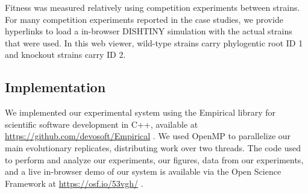 Fitness was measured relatively using competition experiments between strains.
For many competition experiments reported in the case studies, we provide hyperlinks to load a in-browser DISHTINY simulation with the actual strains that were used.
In this web viewer, wild-type strains carry phylogentic root ID 1 and knockout strains carry ID 2.

\subsection{Implementation}

We implemented our experimental system using the Empirical library for scientific software development in C++, available at \url{https://github.com/devosoft/Empirical} \citep{charles_ofria_2019_2575607}.
We used OpenMP to parallelize our main evolutionary replicates, distributing work over two threads.
The code used to perform and analyze our experiments, our figures, data from our experiments, and a live in-browser demo of our system is available via the Open Science Framework at \url{https://osf.io/53vgh/} \citep{foster2017open}.
